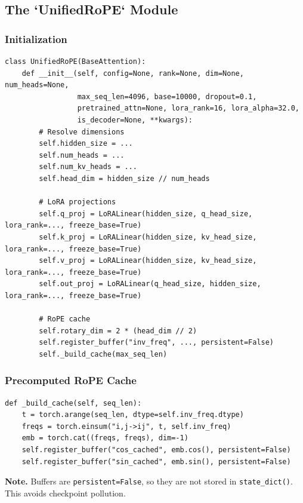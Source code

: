 \subsection{The `UnifiedRoPE` Module}

\subsubsection{Initialization}

\begin{lstlisting}
class UnifiedRoPE(BaseAttention):
    def __init__(self, config=None, rank=None, dim=None, num_heads=None,
                 max_seq_len=4096, base=10000, dropout=0.1,
                 pretrained_attn=None, lora_rank=16, lora_alpha=32.0,
                 is_decoder=None, **kwargs):
        # Resolve dimensions
        self.hidden_size = ...
        self.num_heads = ...
        self.num_kv_heads = ...
        self.head_dim = hidden_size // num_heads
        
        # LoRA projections
        self.q_proj = LoRALinear(hidden_size, q_head_size, lora_rank=..., freeze_base=True)
        self.k_proj = LoRALinear(hidden_size, kv_head_size, lora_rank=..., freeze_base=True)
        self.v_proj = LoRALinear(hidden_size, kv_head_size, lora_rank=..., freeze_base=True)
        self.out_proj = LoRALinear(q_head_size, hidden_size, lora_rank=..., freeze_base=True)
        
        # RoPE cache
        self.rotary_dim = 2 * (head_dim // 2)
        self.register_buffer("inv_freq", ..., persistent=False)
        self._build_cache(max_seq_len)
\end{lstlisting}

\subsubsection{Precomputed RoPE Cache}

\begin{lstlisting}
def _build_cache(self, seq_len):
    t = torch.arange(seq_len, dtype=self.inv_freq.dtype)
    freqs = torch.einsum("i,j->ij", t, self.inv_freq)
    emb = torch.cat((freqs, freqs), dim=-1)
    self.register_buffer("cos_cached", emb.cos(), persistent=False)
    self.register_buffer("sin_cached", emb.sin(), persistent=False)
\end{lstlisting}

\textbf{Note.} Buffers are \texttt{persistent=False}, so they are not stored in 
\texttt{state\_dict()}. This avoids checkpoint pollution.

